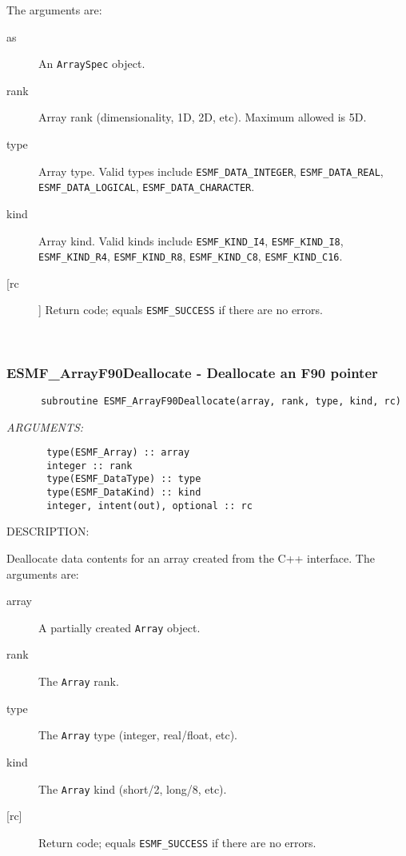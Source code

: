    The arguments are:
   \begin{description}
  
   \item[as]
   An {\tt ArraySpec} object.
  
   \item[rank]
   Array rank (dimensionality, 1D, 2D, etc). Maximum allowed is 5D.
  
   \item[type]
   Array type. Valid types include {\tt ESMF\_DATA\_INTEGER},
   {\tt ESMF\_DATA\_REAL}, {\tt ESMF\_DATA\_LOGICAL},
   {\tt ESMF\_DATA\_CHARACTER}.
  
   \item[kind]
   Array kind. Valid kinds include {\tt ESMF\_KIND\_I4},
   {\tt ESMF\_KIND\_I8}, {\tt ESMF\_KIND\_R4}, {\tt ESMF\_KIND\_R8},
   {\tt ESMF\_KIND\_C8}, {\tt ESMF\_KIND\_C16}.
  
   \item[[rc]]
   Return code; equals {\tt ESMF\_SUCCESS} if there are no errors.
  
   \end{description}
   
 
\mbox{}\hrulefill\ 
 
\subsubsection [ESMF\_ArrayF90Deallocate] {ESMF\_ArrayF90Deallocate - Deallocate an F90 pointer}


  
\begin{verbatim}      subroutine ESMF_ArrayF90Deallocate(array, rank, type, kind, rc)\end{verbatim}{\em ARGUMENTS:}
\begin{verbatim}       type(ESMF_Array) :: array
       integer :: rank
       type(ESMF_DataType) :: type
       type(ESMF_DataKind) :: kind
       integer, intent(out), optional :: rc\end{verbatim}
{\sf DESCRIPTION:\\ }


   Deallocate data contents for an array created from the C++ interface.
   The arguments are:
   \begin{description}
   \item[array]
   A partially created {\tt Array} object.
   \item[rank]
   The {\tt Array} rank.
   \item[type]
   The {\tt Array} type (integer, real/float, etc).
   \item[kind]
   The {\tt Array} kind (short/2, long/8, etc).
   \item[{[rc]}]
   Return code; equals {\tt ESMF\_SUCCESS} if there are no errors.
   \end{description}
   
